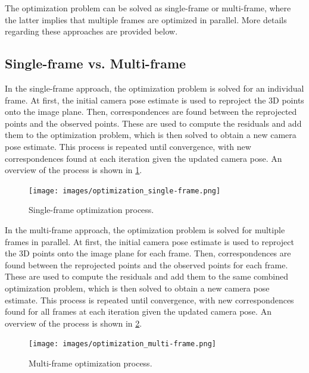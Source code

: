 The optimization problem can be solved as single-frame or multi-frame, where the latter implies that multiple frames are optimized in parallel. More details regarding these approaches are provided below.

\subsection*{Single-frame vs. Multi-frame}


In the single-frame approach, the optimization problem is solved for an individual frame. At first, the initial camera pose estimate is used to reproject the 3D points onto the image plane. Then, correspondences are found between the reprojected points and the observed points. These are used to compute the residuals and add them to the optimization problem, which is then solved to obtain a new camera pose estimate. This process is repeated until convergence, with new correspondences found at each iteration given the updated camera pose. An overview of the process is shown in \cref{fig:optimization_single-frame}.

\begin{figure}[h]
    \centering
    \texttt{[image: images/optimization\_single-frame.png]}
    \caption{Single-frame optimization process.}
    \label{fig:optimization_single-frame}
\end{figure}


In the multi-frame approach, the optimization problem is solved for multiple frames in parallel. At first, the initial camera pose estimate is used to reproject the 3D points onto the image plane for each frame. Then, correspondences are found between the reprojected points and the observed points for each frame. These are used to compute the residuals and add them to the same combined optimization problem, which is then solved to obtain a new camera pose estimate. This process is repeated until convergence, with new correspondences found for all frames at each iteration given the updated camera pose. An overview of the process is shown in \cref{fig:optimization_multi-frame}.

\begin{figure}[h]
    \centering
    \texttt{[image: images/optimization\_multi-frame.png]}
    \caption{Multi-frame optimization process.}
    \label{fig:optimization_multi-frame}
\end{figure}